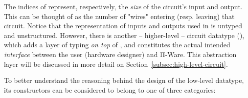         The indices of  represent, respectively, the \emph{size} of the circuit's input and output.
        This can be thought of as the number of "wires" entering (resp. leaving) that circuit.
        Notice that the representation of inputs and outputs used in  is untyped and unstructured.
        However, there is another – higher-level – circuit datatype (),
        which adds a layer of typing \emph{on top} of ,
        and constitutes the actual intended \emph{interface} between the user (hardware designer) and Π-Ware.
        This abstraction layer will be discussed in more detail on Section~\ref{subsec:high-level-circuit}.

        To better understand the reasoning behind the design of the low-level  datatype,
        its constructors can be considered to belong to one of three categories:

